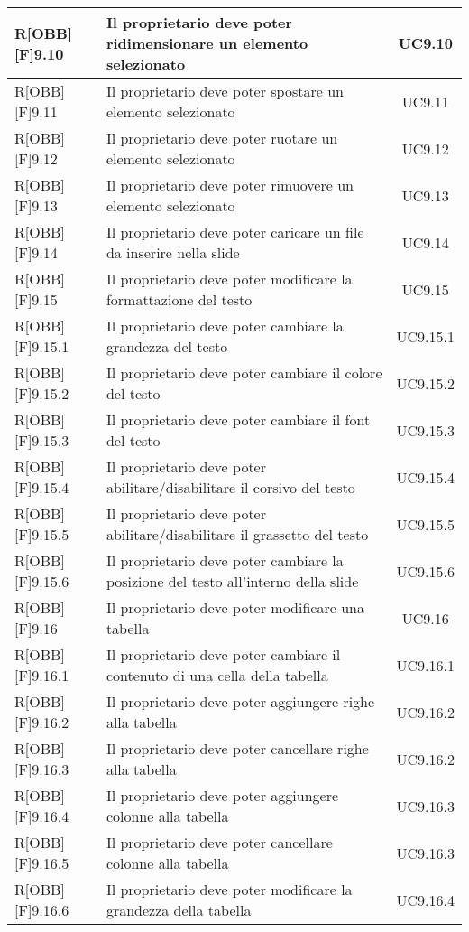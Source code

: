 \begin{longtable}{|l|p{}|c|}
		R[OBB][F]9.10 & Il proprietario deve poter ridimensionare un elemento selezionato & UC9.10 \\ \midrule
		R[OBB][F]9.11 & Il proprietario deve poter spostare un elemento selezionato & UC9.11 \\ \midrule
		R[OBB][F]9.12 & Il proprietario deve poter ruotare un elemento selezionato & UC9.12 \\ \midrule
		R[OBB][F]9.13 & Il proprietario deve poter rimuovere un elemento selezionato & UC9.13 \\ \midrule
		R[OBB][F]9.14 & Il proprietario deve poter caricare un file da inserire nella slide & UC9.14 \\ \midrule
		
		R[OBB][F]9.15 & Il proprietario deve poter modificare la formattazione del testo & UC9.15 \\ \midrule
		R[OBB][F]9.15.1 & Il proprietario deve poter cambiare la grandezza del testo & UC9.15.1 \\ \midrule
		R[OBB][F]9.15.2 & Il proprietario deve poter cambiare il colore del testo & UC9.15.2 \\ \midrule
		R[OBB][F]9.15.3 & Il proprietario deve poter cambiare il font del testo & UC9.15.3 \\ \midrule
		R[OBB][F]9.15.4 & Il proprietario deve poter abilitare/disabilitare il corsivo del testo & UC9.15.4 \\ \midrule
		R[OBB][F]9.15.5 & Il proprietario deve poter abilitare/disabilitare il grassetto del testo & UC9.15.5 \\ \midrule
		R[OBB][F]9.15.6 & Il proprietario deve poter cambiare la posizione del testo all'interno della slide & UC9.15.6 \\ \midrule
		
		R[OBB][F]9.16 & Il proprietario deve poter modificare una tabella & UC9.16 \\ \midrule
		R[OBB][F]9.16.1 & Il proprietario deve poter cambiare il contenuto di una cella della tabella & UC9.16.1 \\ \midrule
		R[OBB][F]9.16.2 & Il proprietario deve poter aggiungere righe alla tabella & UC9.16.2 \\ \midrule
		R[OBB][F]9.16.3 & Il proprietario deve poter cancellare righe alla tabella & UC9.16.2 \\ \midrule
		R[OBB][F]9.16.4 & Il proprietario deve poter aggiungere colonne alla tabella & UC9.16.3 \\ \midrule
		R[OBB][F]9.16.5 & Il proprietario deve poter cancellare colonne alla tabella & UC9.16.3 \\ \midrule
		R[OBB][F]9.16.6 & Il proprietario deve poter modificare la grandezza della tabella & UC9.16.4 \\ \midrule
		

\end{longtable}
